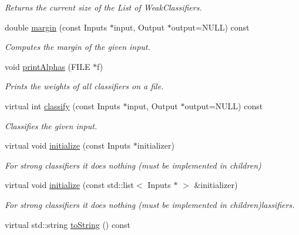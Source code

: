 \begin{DoxyCompactItemize}
\begin{DoxyCompactList}\small\item\em Returns the current size of the List of Weak\+Classifiers. \end{DoxyCompactList}\item 
double \hyperlink{classiCub_1_1boostMIL_1_1StrongClassifier_acd33ed5cc98ed84a61e27b41eec63c5c}{margin} (const Inputs $\ast$input, Output $\ast$output=N\+U\+L\+L) const 
\begin{DoxyCompactList}\small\item\em Computes the margin of the given input. \end{DoxyCompactList}\item 
void \hyperlink{classiCub_1_1boostMIL_1_1StrongClassifier_acdfb5551c7b9315ab4077566809064fc}{print\+Alphas} (F\+I\+L\+E $\ast$f)
\begin{DoxyCompactList}\small\item\em Prints the weights of all classifiers on a file. \end{DoxyCompactList}\item 
virtual int \hyperlink{classiCub_1_1boostMIL_1_1StrongClassifier_a1fee2d421c908292846b6e7356c7c6d1}{classify} (const Inputs $\ast$input, Output $\ast$output=N\+U\+L\+L) const 
\begin{DoxyCompactList}\small\item\em Classifies the given input. \end{DoxyCompactList}\item 
virtual void \hyperlink{classiCub_1_1boostMIL_1_1StrongClassifier_a009ec6d067be95a012082335c1e24937}{initialize} (const Inputs $\ast$initializer)
\begin{DoxyCompactList}\small\item\em For strong classifiers it does nothing (must be implemented in children) \end{DoxyCompactList}\item 
virtual void \hyperlink{classiCub_1_1boostMIL_1_1StrongClassifier_ad6529dabd9cefe82447987b9b650e76e}{initialize} (const std\+::list$<$ Inputs $\ast$ $>$ \&initializer)
\begin{DoxyCompactList}\small\item\em For strong classifiers it does nothing (must be implemented in children)lassifiers. \end{DoxyCompactList}\item 
virtual std\+::string \hyperlink{classiCub_1_1boostMIL_1_1StrongClassifier_adb838aab38a5503330b4335c2b4d7a0f}{to\+String} () const 

\end{DoxyCompactItemize}
